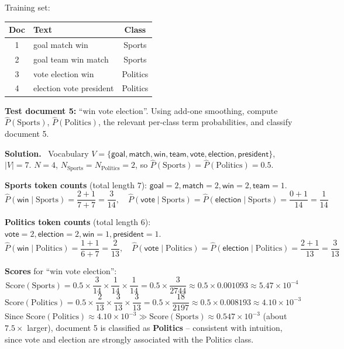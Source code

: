 \documentclass[11pt, a4paper]{article}
\newcommand{\Solution}{\medskip\noindent\textbf{\color{exgreen}Solution.}\ }
\begin{document}
\begin{exercisebox}
Training set:
\begin{center}
\begin{tabular}{@{}clc@{}}
\toprule
Doc & Text & Class \\
\midrule
1 & goal match win & Sports \\
2 & goal team win match & Sports \\
3 & vote election win & Politics \\
4 & election vote president & Politics \\
\bottomrule
\end{tabular}
\end{center}
\textbf{Test document 5:} ``win vote election''. Using add-one smoothing, compute $\hat P(\text{Sports})$, $\hat P(\text{Politics})$, the relevant per-class term probabilities, and classify document 5.
\end{exercisebox}

\Solution
Vocabulary $V=\{\textsf{goal},\textsf{match},\textsf{win},\textsf{team},\textsf{vote},\textsf{election},\textsf{president}\}$, $|V|=7$. $N=4$, $N_{\text{Sports}}=N_{\text{Politics}}=2$, so $\hat P(\text{Sports})=\hat P(\text{Politics})=0.5$.

\textbf{Sports token counts} (total length $7$): $\textsf{goal}=2,\textsf{match}=2,\textsf{win}=2,\textsf{team}=1$.
\[
\hat P(\textsf{win}\mid \text{Sports}) = \frac{2+1}{7+7}=\frac{3}{14}, \quad
\hat P(\textsf{vote}\mid \text{Sports}) = \hat P(\textsf{election}\mid \text{Sports}) = \frac{0+1}{14}=\frac1{14}
\]

\textbf{Politics token counts} (total length $6$): $\textsf{vote}=2,\textsf{election}=2,\textsf{win}=1,\textsf{president}=1$.
\[
\hat P(\textsf{win}\mid \text{Politics}) = \frac{1+1}{6+7}=\frac{2}{13}, \quad
\hat P(\textsf{vote}\mid \text{Politics}) = \hat P(\textsf{election}\mid \text{Politics}) = \frac{2+1}{13}=\frac{3}{13}
\]

\textbf{Scores} for ``win vote election'':
\[
\text{Score}(\text{Sports}) = 0.5\times\frac{3}{14}\times\frac1{14}\times\frac1{14} = 0.5\times\frac{3}{2744} \approx 0.5\times0.001093 \approx 5.47\times10^{-4}
\]
\[
\text{Score}(\text{Politics}) = 0.5\times\frac{2}{13}\times\frac{3}{13}\times\frac{3}{13} = 0.5\times\frac{18}{2197} \approx 0.5\times0.008193 \approx 4.10\times10^{-3}
\]
Since $\text{Score}(\text{Politics}) \approx 4.10\times10^{-3} \gg \text{Score}(\text{Sports}) \approx 0.547\times10^{-3}$ (about $7.5\times$ larger), document 5 is classified as \textbf{Politics} -- consistent with intuition, since \textsf{vote} and \textsf{election} are strongly associated with the Politics class.
\end{document}
